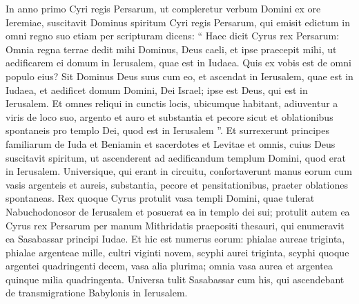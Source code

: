 \begin{biblechapter}
 \verse In anno primo Cyri regis Persarum, ut compleretur verbum Domini ex ore Ieremiae, suscitavit Dominus spiritum Cyri regis Persarum, qui emisit edictum in omni regno suo etiam per scripturam dicens: 
\verse “ Haec dicit Cyrus rex Persarum: Omnia regna terrae dedit mihi Dominus, Deus caeli, et ipse praecepit mihi, ut aedificarem ei domum in Ierusalem, quae est in Iudaea. 
\verse Quis ex vobis est de omni populo eius? Sit Dominus Deus suus cum eo, et ascendat in Ierusalem, quae est in Iudaea, et aedificet domum Domini, Dei Israel; ipse est Deus, qui est in Ierusalem. 
\verse Et omnes reliqui in cunctis locis, ubicumque habitant, adiuventur a viris de loco suo, argento et auro et substantia et pecore sicut et oblationibus spontaneis pro templo Dei, quod est in Ierusalem ”.
 \verse Et surrexerunt principes familiarum de Iuda et Beniamin et sacerdotes et Levitae et omnis, cuius Deus suscitavit spiritum, ut ascenderent ad aedificandum templum Domini, quod erat in Ierusalem. 
\verse Universique, qui erant in circuitu, confortaverunt manus eorum cum vasis argenteis et aureis, substantia, pecore et pensitationibus, praeter oblationes spontaneas.
 \verse Rex quoque Cyrus protulit vasa templi Domini, quae tulerat Nabuchodonosor de Ierusalem et posuerat ea in templo dei sui; 
\verse protulit autem ea Cyrus rex Persarum per manum Mithridatis praepositi thesauri, qui enumeravit ea Sasabassar principi Iudae. 
\verse Et hic est numerus eorum: phialae aureae triginta, phialae argenteae mille, cultri viginti novem, scyphi aurei triginta, 
\verse scyphi quoque argentei quadringenti decem, vasa alia plurima; \verse omnia vasa aurea et argentea quinque milia quadringenta. Universa tulit Sasabassar cum his, qui ascendebant de transmigratione Babylonis in Ierusalem.
 

\end{biblechapter}

